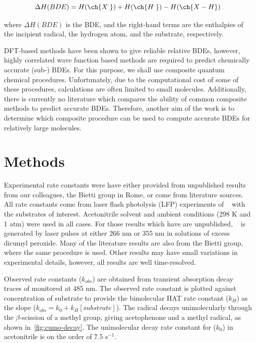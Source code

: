 \begin{equation}
  \Delta H(BDE) =  H(\ch{X^.}) + H(\ch{H^.}) - H(\ch{X-H})
\end{equation}

\noindent where $\Delta H(BDE)$ is the BDE, and the right-hand terms are the enthalpies of the incipient radical, the hydrogen atom, and the substrate, respectively.

DFT-based methods have been shown to give reliable relative BDEs, however, highly correlated wave function based methods are required to predict chemically accurate (sub-\kcalmol) BDEs.\cite{DiLabio1999, Chan2012, Wiberg2014} For this purpose, we shall use composite quantum chemical procedures. Unfortunately, due to the computational cost of some of these procedures, calculations are often limited to small molecules. Additionally, there is currently no literature which compares the ability of common composite methods to predict accurate BDEs. Therefore, another aim of the work is to determine which composite procedure can be used to compute accurate BDEs for relatively large molecules.

\section{Methods}

Experimental rate constants were have either provided from unpublished results from our colleagues, the Bietti group in Rome, or come from literature sources.\cite{Bietti2010, Bietti2011, Pischel2001, Salamone2011, Salamone2012, Salamone2012a, Salamone2013, Salamone2015} All rate constants come from laser flash photolysis (LFP) experiments of \cumo~ with the substrates of interest. Acetonitrile solvent and ambient conditions (298 K and 1 atm) were used in all cases. For those results which have are unpublished, \cumo~ is generated by laser pulses at either 266 nm or 355 nm in solutions of excess dicumyl peroxide. Many of the literature results are also from the Bietti group, where the same procedure is used. Other results may have small variations in experimental details, however, all results are well time-resolved.

Observed rate constants ($k_{obs}$) are obtained from transient absorption decay traces of \cumo monitored at 485 nm. The observed rate constant is plotted against concentration of substrate to provide the bimolecular HAT rate constant ($k_H$) as the slope ($k_{obs} = k_0 + k_H[substrate]$). The \cumo radical decays unimolecularly through the $\beta$-scission of a methyl group, giving acetophenone and a methyl radical, as shown in~\ref{fig:cumo-decay}. The unimolecular decay rate constant\cite{Avila1995} for \cumo ($k_0$) in acetonitrile is on the order of 7.5  s$^{-1}$.

